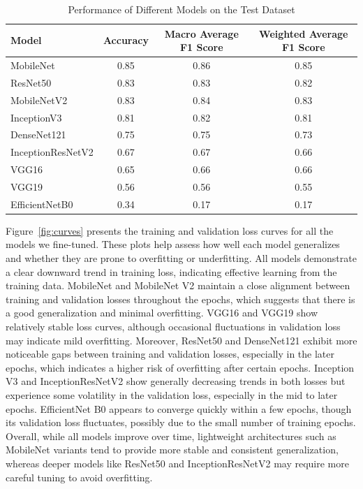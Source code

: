 \documentclass[11pt]{article}
\begin{document}

\begin{table}[H]
    \centering
    \caption{Performance of Different Models on the Test Dataset}\label{tab:cnn_results}
    \begin{tabular}{l c c c}
        \toprule
        \textbf{Model} & \textbf{Accuracy} & \textbf{Macro Average F1 Score} & \textbf{Weighted Average F1 Score} \\
        \midrule
        MobileNet & 0.85 & 0.86 & 0.85 \\
        ResNet50 & 0.83 & 0.83 & 0.82 \\
        MobileNetV2 & 0.83 & 0.84 & 0.83 \\        
        InceptionV3 & 0.81 & 0.82 & 0.81 \\
        DenseNet121 & 0.75 & 0.75 & 0.73 \\
        InceptionResNetV2 & 0.67 & 0.67 & 0.66 \\
        VGG16 & 0.65 & 0.66 & 0.66 \\
        VGG19 & 0.56 & 0.56 & 0.55 \\        
        EfficientNetB0 & 0.34 & 0.17 & 0.17 \\
        \bottomrule
    \end{tabular}
\end{table}

Figure~\ref{fig:curves} presents the training and validation loss curves for all the models we fine-tuned. These plots help assess how well each model generalizes and whether they are prone to overfitting or underfitting. All models demonstrate a clear downward trend in training loss, indicating effective learning from the training data. MobileNet and MobileNet V2 maintain a close alignment between training and validation losses throughout the epochs, which suggests that there is a good generalization and minimal overfitting. VGG16 and VGG19 show relatively stable loss curves, although occasional fluctuations in validation loss may indicate mild overfitting. Moreover, ResNet50 and DenseNet121 exhibit more noticeable gaps between training and validation losses, especially in the later epochs, which indicates a higher risk of overfitting after certain epochs. Inception V3 and InceptionResNetV2 show generally decreasing trends in both losses but experience some volatility in the validation loss, especially in the mid to later epochs. EfficientNet B0 appears to converge quickly within a few epochs, though its validation loss fluctuates, possibly due to the small number of training epochs. Overall, while all models improve over time, lightweight architectures such as MobileNet variants tend to provide more stable and consistent generalization, whereas deeper models like ResNet50 and InceptionResNetV2 may require more careful tuning to avoid overfitting.
\end{document}
